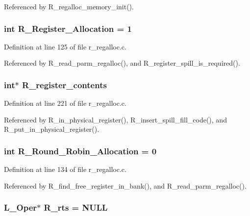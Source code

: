 Referenced by R\_\-regalloc\_\-memory\_\-init().
\subsubsection{\setlength{\rightskip}{0pt plus 5cm}int \bf{R\_\-Register\_\-Allocation} = 1}\label{r__regalloc_8c_da5733999d55af991a5c2cbdb4451e3a}




Definition at line 125 of file r\_\-regalloc.c.

Referenced by R\_\-read\_\-parm\_\-regalloc(), and R\_\-register\_\-spill\_\-is\_\-required().
\subsubsection{\setlength{\rightskip}{0pt plus 5cm}int$\ast$ \bf{R\_\-register\_\-contents}}\label{r__regalloc_8c_3ce7ce30fdd85726021a9fbe22baaa56}




Definition at line 221 of file r\_\-regalloc.c.

Referenced by R\_\-in\_\-physical\_\-register(), R\_\-insert\_\-spill\_\-fill\_\-code(), and R\_\-put\_\-in\_\-physical\_\-register().
\subsubsection{\setlength{\rightskip}{0pt plus 5cm}int \bf{R\_\-Round\_\-Robin\_\-Allocation} = 0}\label{r__regalloc_8c_0b4893f94d0a988fc0b549ef95004f68}




Definition at line 134 of file r\_\-regalloc.c.

Referenced by R\_\-find\_\-free\_\-register\_\-in\_\-bank(), and R\_\-read\_\-parm\_\-regalloc().
\subsubsection{\setlength{\rightskip}{0pt plus 5cm}L\_\-Oper$\ast$ \bf{R\_\-rts} = \bf{NULL}}\label{r__regalloc_8c_844ae0cf78616c8d50d0cd640dda9fee}




